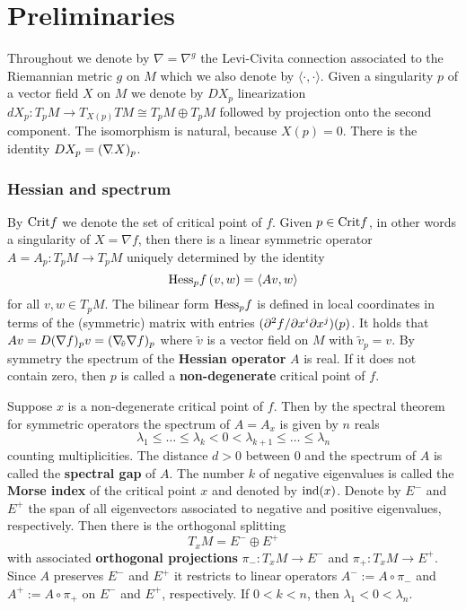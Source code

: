 \documentclass{article}
\begin{document}
\section{Preliminaries}\label{sec:setup-hyp-sing}

Throughout we denote by $\nabla=\nabla^g$ the Levi-Civita connection associated to
the  Riemannian metric $g$ on $M$ which we also denote by $\langle\cdot ,\cdot\rangle$.
Given a singularity $p$ of a vector field $X$ on $M$ we denote by $DX_p$
linearization $dX_p:T_pM\to T_{X(p)}TM\cong T_pM\oplus T_pM$
followed by projection onto the second component. The isomorphism is natural, because $X(p)=0$.
There is the identity $DX_p=(\nabla\kern-.5ex{}_{\cdot} X)_p$.

\subsubsection*{Hessian and spectrum}
By ${\rm Crit} f$ we denote the set of critical point of $f$.
Given $p\in{\rm Crit} f$, in other words a singularity of $X=\nabla f$,
then there is a linear symmetric operator $A=A_p:T_pM\to T_pM$
uniquely determined by the identity
\begin{equation}\label{eq:Hess-op}
     \Hess_p f\, (v,w)
     =\langle A v,w\rangle
\end{equation}
for all $v,w\in T_pM$. The bilinear form $\mathrm{Hess}_p f$ is defined in local
coordinates in terms of the (symmetric) matrix with entries
$({\partial}^2 f/{\partial} x^i{\partial} x^j)(p)$. It holds that $Av=D(\nabla f)_pv=(\nabla\kern-.5ex{}_{\tilde v}\nabla f)_p$
where $\tilde v$ is a vector field on $M$ with $\tilde v_p=v$.
%
By symmetry the spectrum of the {\bf Hessian operator} $A$ is real. If it does not contain
zero, then $p$ is called a {\bf non-degenerate} critical point of $f$.

Suppose $x$ is a non-degenerate critical point of $f$.
Then by the spectral theorem for symmetric operators the spectrum of
$A=A_x$ is given by $n$ reals
\begin{equation}\label{eq:spec-A}
     \lambda_1\le\dots\le\lambda_k<0
     <\lambda_{k+1}\le\dots\le\lambda_n
\end{equation}
counting multiplicities.
The distance $d>0$ between $0$ and
the spectrum of $A$ is called the
{\bf spectral gap} of $A$.
The number $k$ of negative eigenvalues
is called the {\bf Morse index} of the critical
point $x$ and denoted by ${\rm ind}(x)$.
Denote by $E^-$ and $E^+$ the span of all
eigenvectors associated to negative and
positive eigenvalues, respectively.
Then there is the orthogonal splitting
\begin{equation}\label{eq:splitting}
     T_xM=E^-\oplus E^+
\end{equation}
with associated
{\bf orthogonal projections} $\pi_-:T_xM\to E^-$
and $\pi_+:T_xM\to E^+$.
Since $A$ preserves $E^-$ and
$E^+$ it restricts to linear operators
$A^-:=A\circ\pi_-$ and $A^+:=A\circ\pi_+$ on $E^-$
and $E^+$, respectively.
If $0<k<n$, then $\lambda_1<0<\lambda_n$.
\end{document}
